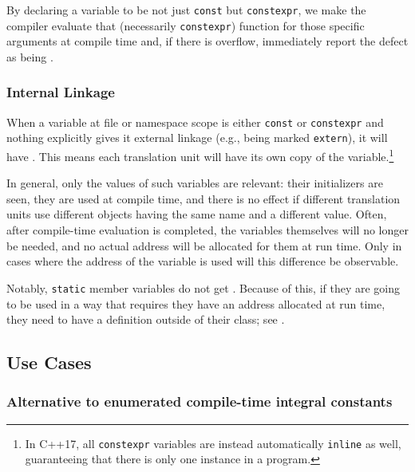 \noindent By declaring a variable to be not just \lstinline!const! but
\lstinline!constexpr!, we make the compiler evaluate that (necessarily
\lstinline!constexpr!) function for those specific arguments at compile
time and, if there is overflow, immediately report the defect as being
.

\subsubsection[Internal Linkage]{Internal Linkage}

When a variable at file or namespace scope is either \lstinline!const! or \lstinline!constexpr! and nothing explicitly gives it external linkage (e.g., being marked \lstinline!extern!), it
will have .  This means each translation unit will have its own copy of the
variable.{\cprotect\footnote{In C++17, all \lstinline!constexpr! variables are instead automatically \lstinline!inline! as well,
guaranteeing that there is only one instance in a program.}}

In general, only the values of such variables are relevant: their initializers are seen, they are used at compile time, and there is no effect if different translation units use different objects having the same
name and a different value.  Often, after compile-time evaluation is completed, the variables themselves will no longer be
needed, and no actual address will be allocated for them at run time.   Only in cases where the address of
the variable is used will this difference be observable.

Notably, \lstinline!static! member variables do not get .  Because of this, if they
are going to be used in a way that requires they have an address allocated at run time, they need to have a
definition outside of their class; see .

\subsection[Use Cases]{Use Cases}\label{use-cases}

\subsubsection[Alternative to enumerated compile-time integral constants]{Alternative to enumerated compile-time integral constants}\label{alternative-to-enumerated-compile-time-integral-constants}

